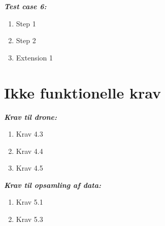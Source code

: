 \newpage

\textbf{\textit{Test case 6:} }
\begin{enumerate}
\item Step 1
\item Step 2
\item Extension 1\\
\end{enumerate}	


\section{Ikke funktionelle krav}

\textbf{\textit{Krav til drone:} }
\begin{enumerate}
\item Krav 4.3
\item Krav 4.4
\item Krav 4.5\\
\end{enumerate}

\textbf{\textit{Krav til opsamling af data:} }
\begin{enumerate}
\item Krav 5.1
\item Krav 5.3\\
\end{enumerate}